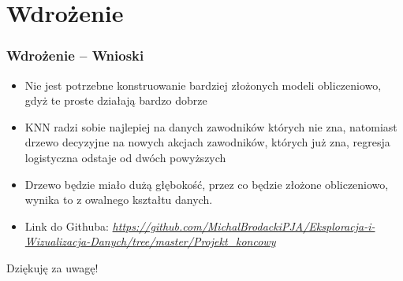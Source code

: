 \documentclass{beamer}
\begin{document}
	\section{Wdrożenie}
		\begin{frame}
			\frametitle{Wdrożenie -- Wnioski}
			\begin{itemize}
				\item Nie jest potrzebne konstruowanie bardziej złożonych modeli obliczeniowo, gdyż te proste działają bardzo dobrze
				\item KNN radzi sobie najlepiej na danych zawodników których nie zna, natomiast drzewo decyzyjne na nowych akcjach zawodników, których już zna, regresja logistyczna odstaje od dwóch powyższych
				\item Drzewo będzie miało dużą głębokość, przez co będzie złożone obliczeniowo, wynika to z owalnego kształtu danych.
				\item Link do Githuba: \textit{\url{https://github.com/MichalBrodackiPJA/Eksploracja-i-Wizualizacja-Danych/tree/master/Projekt_koncowy}}
			\end{itemize}
			
				\vspace{0.5cm}
			
			\centering\Large{Dziękuję za uwagę!}
			
		\end{frame}
		
\end{document}
